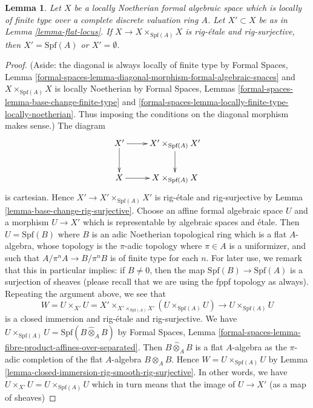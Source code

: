 \documentclass{stacks-project}
\theoremstyle{plain}
\newtheorem{lemma}[subsection]{Lemma}
\theoremstyle{definition}
\theoremstyle{remark}
\numberwithin{equation}{subsection}
\begin{document}
\begin{lemma}
\label{lemma-flat-and-diagonal-rig-surjective}
Let $X$ be a locally Noetherian formal algebraic space which is
locally of finite type over a complete discrete valuation ring $A$.
Let $X' \subset X$ be as in Lemma \ref{lemma-flat-locus}.
If $X \to X \times_{\text{Spf}(A)} X$ is rig-\'etale and rig-surjective,
then $X' = \text{Spf}(A)$ or $X' = \emptyset$.
\end{lemma}

\begin{proof}
(Aside: the diagonal is always locally of finite type by
Formal Spaces, Lemma
\ref{formal-spaces-lemma-diagonal-morphism-formal-algebraic-spaces}
and $X \times_{\text{Spf}(A)} X$ is locally Noetherian by
Formal Spaces, Lemmas
\ref{formal-spaces-lemma-base-change-finite-type} and
\ref{formal-spaces-lemma-locally-finite-type-locally-noetherian}.
Thus imposing the conditions on the diagonal morphism makes sense.)
The diagram
$$
\xymatrix{
X' \ar[r] \ar[d] & X' \times_{\text{Spf}(A)} X' \ar[d] \\
X \ar[r] & X \times_{\text{Spf}(A)} X
}
$$
is cartesian. Hence $X' \to X' \times_{\text{Spf}(A)} X'$
is rig-\'etale and rig-surjective by
Lemma \ref{lemma-base-change-rig-surjective}.
Choose an affine formal algebraic space $U$ and a morphism
$U \to X'$ which is representable by algebraic spaces and \'etale.
Then $U = \text{Spf}(B)$ where $B$ is an adic Noetherian topological ring
which is a flat $A$-algebra, whose topology is the $\pi$-adic
topology where $\pi \in A$ is a uniformizer, and such that
$A/\pi^n A \to B/\pi^n B$ is of finite type for each $n$.
For later use, we remark that this in particular implies: if $B \not = 0$,
then the map $\text{Spf}(B) \to \text{Spf}(A)$ is a surjection
of sheaves (please recall that we are using the fppf topology
as always). Repeating the argument above, we see that
$$
W = U \times_{X'} U =
X' \times_{X' \times_{\text{Spf}(A)} X'} (U \times_{\text{Spf}(A)} U)
\longrightarrow
U \times_{\text{Spf}(A)} U
$$
is a closed immersion and rig-\'etale and rig-surjective. We have
$U \times_{\text{Spf}(A)} U = \text{Spf}(B \widehat{\otimes}_A B)$
by Formal Spaces, Lemma
\ref{formal-spaces-lemma-fibre-product-affines-over-separated}.
Then $B \widehat{\otimes}_A B$ is a flat $A$-algebra
as the $\pi$-adic completion of the flat $A$-algebra $B \otimes_A B$.
Hence $W = U \times_{\text{Spf}(A)} U$ by
Lemma \ref{lemma-closed-immersion-rig-smooth-rig-surjective}.
In other words, we have $U \times_{X'} U = U \times_{\text{Spf}(A)} U$
which in turn means that the image of $U \to X'$ (as a map of sheaves)

\end{proof}
\end{document}
